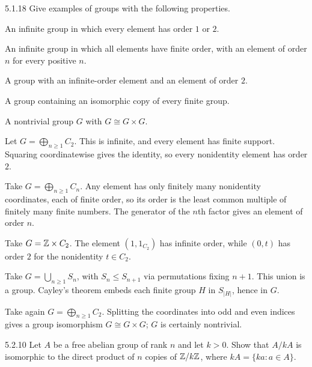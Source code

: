 \documentclass[11pt,oneside]{article}
\begin{document}
\begin{exercise}{5.1.18}
Give examples of groups with the following properties.
\begin{exercisesubparts}
\item An infinite group in which every element has order $1$ or $2$.
\item An infinite group in which all elements have finite order, with an element of order $n$ for every positive $n$.
\item A group with an infinite-order element and an element of order $2$.
\item A group containing an isomorphic copy of every finite group.
\item A nontrivial group $G$ with $G\cong G\times G$.
\end{exercisesubparts}
\end{exercise}

\begin{solution}
\begin{exercisesubparts}
\item Let $G=\bigoplus_{n\ge1}C_2$. This is infinite, and every element has finite support. Squaring coordinatewise gives the identity, so every nonidentity element has order $2$.
\item Take $G=\bigoplus_{n\ge1}C_n$. Any element has only finitely many nonidentity coordinates, each of finite order, so its order is the least common multiple of finitely many finite numbers. The generator of the $n$th factor gives an element of order $n$.
\item Take $G=\mathbb{Z}\times C_2$. The element $(1,1_{C_2})$ has infinite order, while $(0,t)$ has order $2$ for the nonidentity $t\in C_2$.
\item Take $G=\bigcup_{n\ge1}S_n$, with $S_n\le S_{n+1}$ via permutations fixing $n+1$. This union is a group. Cayley's theorem embeds each finite group $H$ in $S_{|H|}$, hence in $G$.
\item Take again $G=\bigoplus_{n\ge1}C_2$. Splitting the coordinates into odd and even indices gives a group isomorphism $G\cong G\times G$; $G$ is certainly nontrivial.
\end{exercisesubparts}
\end{solution}

\begin{exercise}{5.2.10}
Let $A$ be a free abelian group of rank $n$ and let $k>0$. Show that $A/kA$ is isomorphic to the direct product of $n$ copies of $\mathbb{Z}/k\mathbb{Z}$, where $kA=\{ka:a\in A\}$.
\end{exercise}
\end{document}
